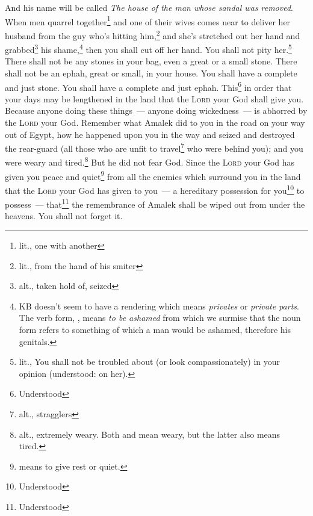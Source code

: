 \begin{inparaenum}
     And his name will be called \textit{The house of the man whose sandal was removed}.%
     When men quarrel together\footnote{lit., one with another} and one of their wives comes near to deliver her husband from the guy who's hitting him,\footnote{lit., from the hand of his smiter} and she's stretched out her hand and grabbed\footnote{alt., taken hold of, seized} his shame,\footnote{KB doesn't seem to have a rendering which means \textit{privates} or \textit{private parts}. The verb form, , means \textit{to be ashamed} from which we surmise that the noun form refers to something of which a man would be ashamed, therefore his genitals.}%
     then you shall cut off her hand. You shall not pity her.\footnote{lit., You shall not be troubled about (or look compassionately) in your opinion (understood: on her).}%
     There shall not be any stones in your bag, even a great or a small stone.%
     There shall not be an ephah, great or small, in your house.%
     You shall have a complete and just stone. You shall have a complete and just ephah. This\footnote{Understood} in order that your days may be lengthened in the land that the \textsc{Lord} your God shall give you.%
     Because anyone doing these things~--- anyone doing wickedness~--- is abhorred by the \textsc{Lord} your God.%
     Remember what Amalek did to you in the road on your way out of Egypt,%
     how he happened upon you in the way and seized and destroyed the rear-guard (all those who are unfit to travel\footnote{alt., stragglers} who were behind you); and you were weary and tired.\footnote{alt., extremely weary. Both  and  mean weary, but the latter also means tired.} But he did not fear God.%
     Since the \textsc{Lord} your God has given you peace and quiet\footnote{ means to give rest or quiet.} from all the enemies which surround you in the land that the \textsc{Lord} your God has given to you~--- a hereditary possession for you\footnote{Understood} to possess~--- that\footnote{Understood} the remembrance of Amalek shall be wiped out from under the heavens. You shall not forget it.%
\end{inparaenum}
